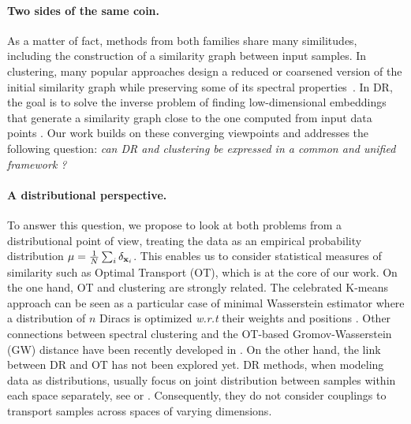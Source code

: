 \paragraph{Two sides of the same coin.} As a matter of fact, methods from both families share many similitudes, %
including the construction of a similarity graph between input samples. In clustering, many popular approaches design a reduced or coarsened version of the initial similarity graph while preserving some of its spectral properties~\citep{von2007tutorial, schaeffer2007graph}. 
In DR, the goal is to solve the inverse problem of finding low-dimensional embeddings that generate a similarity graph close to the %
one computed from input data points \citep{ham2004kernel,hinton2002stochastic}.
Our work builds on these converging viewpoints and addresses the following question: \emph{can DR and clustering  be expressed in a common and unified framework ?}

\paragraph{A distributional perspective.} To answer this question, we
propose to look at both problems from a distributional point of view, treating the data as an empirical probability distribution
$\mu=\frac{1}{N}\sum_i\delta_{{\mathbf{x}}_i}$. 
This enables us to consider statistical measures of similarity such as Optimal Transport (OT), which is at the core of our work.
On the one hand, OT and clustering are strongly related.
The celebrated K-means approach can be seen as a particular case of minimal Wasserstein estimator where a distribution of $n$ Diracs is optimized \textit{w.r.t} their weights and positions \citep{Canas12}. Other connections between spectral clustering and the OT-based Gromov-Wasserstein (GW) distance have been recently developed in \citet{chowdhury2021generalized,chen2023gromov,vincent2021semi}. On the other hand, the link between DR and OT has not been explored yet. DR methods, when modeling data as distributions,
usually focus on joint distribution between samples within each space separately, see \eg \citet{van2023snekhorn} or \citet{lu2019doubly}.
Consequently, they do not consider couplings to transport samples across spaces of varying dimensions. %

